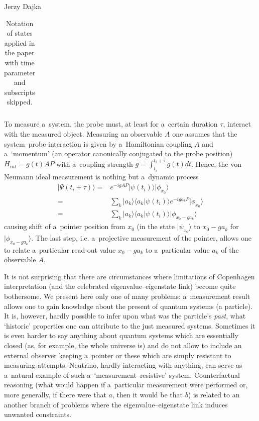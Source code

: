 \begin{artengenv}{Jerzy Dajka}
\begin{table}[ht]
\begin{tabular}{|l||l|}
\end{tabular}
\caption{\label{tabx} Notation of states applied in the paper with time parameter and subscripts skipped.}
\end{table}
  To measure a~system, the probe must, at least for a~certain duration $\tau$, interact with the measured object. Measuring an observable $A$ one assumes that the system--probe interaction is given by a~Hamiltonian coupling $A$ and a~`momentum' (an operator canonically conjugated to the  probe position) 
  \mbox{$H_{int}=g(t)AP$} with a~coupling strength $g=\int_{t_i}^{t_i+\tau} g(t)dt$. 
  Hence, the von Neumann ideal measurement is nothing but a~dynamic process 
  \begin{equation}
     \begin{split}\label{ideal}
            |\Psi(t_i+\tau)\rangle
            = &e^{-igAP}|\psi(t_i)\rangle|\phi_{x_0}\rangle\\
            = &\sum_k|a_k\rangle\langle a_k|\psi(t_i)\rangle e^{-iga_k P}|\phi_{x_0}\rangle\\
            = &\sum_k|a_k\rangle\langle a_k|\psi(t_i)\rangle|\phi_{x_0-ga_k}\rangle
     \end{split}
  \end{equation}
causing shift of a~pointer position from $x_0$ (in the state $|\psi_{x_0}\rangle$ to $x_0-ga_k$ for $|\phi_{x_0-ga_k}\rangle$. The last step, i.e. a~projective measurement of the pointer, allows one to relate a~particular  read-out value $x_0-ga_k$ to a~particular value $a_k$ of the observable $A$. 

It is not surprising that there are circumstances where  limitations of Copenhagen interpretation (and the celebrated eigenvalue--eigenstate link) become quite bothersome. We present here only one of many problems: 
a~measurement result allows one to gain knowledge about the present of quantum systems (a particle). It is, however, hardly possible to infer upon what was the particle's {\it past}, what `historic' properties one can attribute to the just measured systems. Sometimes  it is even harder to say anything about  quantum systems which are essentially closed (as, for example, the whole universe is) and do not allow to include an external observer keeping a~pointer or these which are simply resistant to measuring attempts. Neutrino, hardly interacting with anything, can serve as a~natural example of such a~`measurement--resistive' system. Counterfactual reasoning  (what would happen if a~particular measurement were performed  or, more generally,  if there were that $a$, then it would be that $b$) is related to an another branch of problems where the eigenvalue--eigenstate link induces unwanted constraints. 


\end{artengenv}
